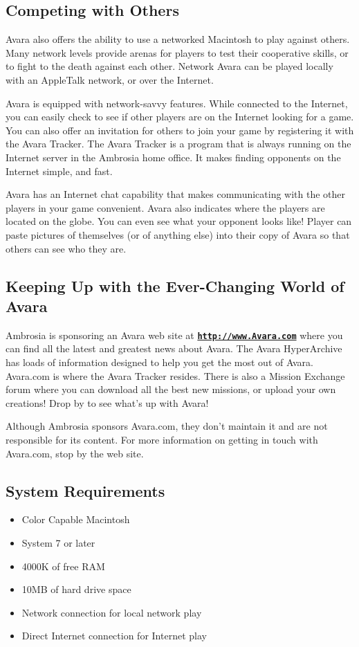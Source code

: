 \documentclass{article}
\begin{document}
\subsection{Competing with Others}
Avara also offers the ability to use a networked Macintosh to play against others. Many network levels provide arenas for players to test their cooperative skills, or to fight to the death against each other. Network Avara can be played locally with an AppleTalk network, or over the Internet.

Avara is equipped with network-savvy features. While connected to the Internet, you can easily check to see if other players are on the Internet looking for a game. You can also offer an invitation for others to join your game by registering it with the Avara Tracker. The Avara Tracker is a program that is always running on the Internet server in the Ambrosia home office. It makes finding opponents on the Internet simple, and fast.

Avara has an Internet chat capability that makes communicating with the other players in your game convenient. Avara also indicates where the players are located on the globe. You can even see what your opponent looks like! Player can paste pictures of themselves (or of anything else) into their copy of Avara so that others can see who they are.

\subsection{Keeping Up with the Ever-Changing World of Avara}
Ambrosia is sponsoring an Avara web site at \textbf{\href{https://web.archive.org/web/20000302231943/http://www.avara.com:80/}{\texttt{http://www.Avara.com}}} where you can find all the latest and greatest news about Avara. The Avara HyperArchive has loads of information designed to help you get the most out of Avara. Avara.com is where the Avara Tracker resides. There is also a Mission Exchange forum where you can download all the best new missions, or upload your own creations! Drop by to see what's up with Avara!

Although Ambrosia sponsors Avara.com, they don't maintain it and are not responsible for its content. For more information on getting in touch with Avara.com, stop by the web site.

\subsection{System Requirements}
\begin{itemize}
	\item Color Capable Macintosh
	\item System 7 or later
	\item 4000K of free RAM
	\item 10MB of hard drive space
	\item Network connection for local network play
	\item Direct Internet connection for Internet play
\end{itemize}
\end{document}
